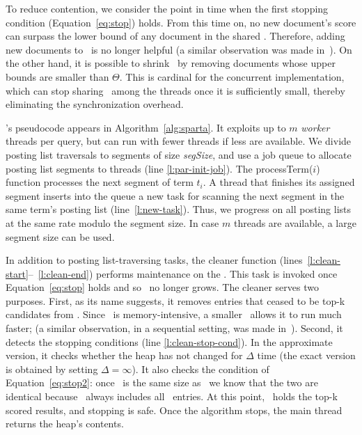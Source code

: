 To reduce contention, we 
consider the point in time when the first stopping condition (Equation~\ref{eq:stop}) holds. From this time on, no new document's score can surpass the lower bound of any document in the shared \DHeap. Therefore, adding new documents to \DMap\ is no longer helpful (a similar observation was made  in~\cite{Mamoulis:2007}). 
On the other hand, it is possible to shrink \DMap\ by removing documents whose upper bounds are smaller than $\Theta$.
This is cardinal for the concurrent implementation, which can stop sharing \DMap\ among the threads once it is sufficiently small, thereby eliminating the synchronization overhead. 





\alg's pseudocode appears in Algorithm~\ref{alg:sparta}. It 
exploits up to $m$ {\em worker\/} threads per query, but can run with fewer threads if less are available. 
We divide posting list traversals to segments of size \emph{segSize}, and use a job queue to allocate posting list segments to threads (line \ref{l:par-init-job}). 
The  {\sc processTerm($i$)} function processes the next segment of term $t_i$. 
A  thread that finishes its assigned segment inserts into the queue a new task for scanning the next segment in the same term's posting list 
(line~\ref{l:new-task}). Thus, we  progress on all posting lists at the same rate modulo the segment size. 
In case $m$ threads are available, a large segment size can be used.

In addition to  posting list-traversing tasks, the 
{\sc cleaner} function (lines~\ref{l:clean-start}--~\ref{l:clean-end}) performs maintenance on the \DMap.
This task is invoked once Equation~\ref{eq:stop} holds and so  \DMap\ no longer grows.
The cleaner serves two purposes. First, as its name suggests, it removes 
entries that ceased to be top-k candidates from \DMap. %
Since \alg\ is memory-intensive, a smaller \DMap\  allows it to run much faster; 
(a similar observation, in a sequential setting, was made in~\cite{Gursky:2008}). 
Second, it detects the stopping conditions (line \ref{l:clean-stop-cond}). In the approximate version, it checks whether the heap has not changed for $\Delta$ time 
(the exact version is obtained by setting $\Delta=\infty$). It also checks the  condition of Equation~\ref{eq:stop2}: 
once \DMap\ is the same size as \DHeap\ we know that the two are identical because \DMap\ always includes all \DHeap\ entries. 
At this point, \DHeap\ holds the top-k scored results, and stopping is safe. 
%
Once the algorithm stops, the main thread returns the heap's contents. 

